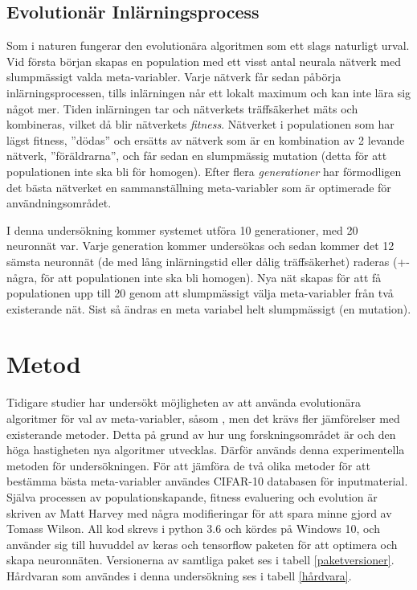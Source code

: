 \documentclass[a4paper, 12pt]{article}
\begin{document}
    \subsection{Evolutionär Inlärningsprocess}
    Som i naturen fungerar den evolutionära algoritmen som ett slags naturligt urval. Vid första början skapas en population med ett visst antal neurala nätverk med slumpmässigt valda meta-variabler. Varje nätverk får sedan påbörja inlärningsprocessen, tills inlärningen når ett lokalt maximum och kan inte lära sig något mer. Tiden inlärningen tar och nätverkets träffsäkerhet mäts och kombineras, vilket då blir nätverkets \textit{fitness}. Nätverket i populationen som har lägst fitness, ”dödas” och ersätts av nätverk som är en kombination av 2 levande nätverk, ”föräldrarna”, och får sedan en slumpmässig mutation (detta för att populationen inte ska bli för homogen). Efter flera \textit{generationer} har förmodligen det bästa nätverket en sammanställning meta-variabler som är optimerade för användningsområdet. \parencite{yao1997new}

    I denna undersökning kommer systemet utföra 10 generationer, med 20 neuronnät var. Varje generation kommer undersökas och sedan kommer det 12 sämsta neuronnät (de med lång inlärningstid eller dålig träffsäkerhet) raderas (+- några, för att populationen inte ska bli homogen).  Nya nät skapas för att få populationen upp till 20 genom att slumpmässigt välja meta-variabler från två existerande nät. Sist så ändras en meta variabel helt slumpmässigt (en mutation).


\newpage

  \section{Metod}
  Tidigare studier har undersökt möjligheten av att använda evolutionära algoritmer för val av meta-variabler, såsom \textcite{yao1997new}, men det krävs fler jämförelser med existerande metoder. Detta på grund av hur ung forskningsområdet är och den höga hastigheten nya algoritmer utvecklas. Därför används denna experimentella metoden för undersökningen. För att jämföra de två olika metoder för att bestämma bästa meta-variabler användes CIFAR-10 databasen för inputmaterial. Själva processen av populationskapande, fitness evaluering och evolution är skriven av Matt Harvey \parencite{harvey2017} med några modifieringar för att spara minne gjord av Tomass Wilson. All kod skrevs i python 3.6 och kördes på Windows 10, och använder sig till huvuddel av keras och tensorflow paketen för att optimera och skapa neuronnäten. Versionerna av samtliga paket ses i tabell \ref{paketversioner}. Hårdvaran som användes i denna undersökning ses i tabell \ref{hårdvara}.
\end{document}
